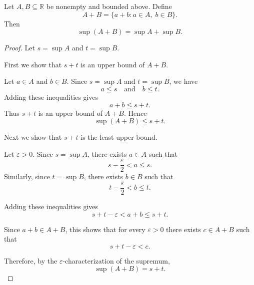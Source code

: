 \begin{theorem*}
Let $A,B \subseteq \mathbb{R}$ be nonempty and bounded above. Define
\[
A+B=\{a+b : a\in A,\; b\in B\}.
\]
Then
\[
\sup(A+B)=\sup A+\sup B.
\]
\end{theorem*}

\begin{proof}
Let $s=\sup A$ and $t=\sup B$.

First we show that $s+t$ is an upper bound of $A+B$.

Let $a\in A$ and $b\in B$. Since $s=\sup A$ and $t=\sup B$, we have
\[
a \le s \quad \text{and} \quad b \le t.
\]
Adding these inequalities gives
\[
a+b \le s+t.
\]
Thus $s+t$ is an upper bound of $A+B$. Hence
\[
\sup(A+B) \le s+t.
\]

Next we show that $s+t$ is the least upper bound.

Let $\varepsilon>0$. Since $s=\sup A$, there exists $a\in A$ such that
\[
s-\frac{\varepsilon}{2} < a \le s.
\]
Similarly, since $t=\sup B$, there exists $b\in B$ such that
\[
t-\frac{\varepsilon}{2} < b \le t.
\]

Adding these inequalities gives
\[
s+t-\varepsilon < a+b \le s+t.
\]

Since $a+b \in A+B$, this shows that for every $\varepsilon>0$ there exists
$c\in A+B$ such that
\[
s+t-\varepsilon < c.
\]

Therefore, by the $\varepsilon$-characterization of the supremum,
\[
\sup(A+B)=s+t.
\]
\end{proof}
